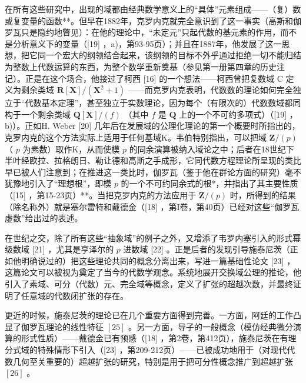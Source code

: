 在所有这些研究中，出现的域都由经典数学意义上的“具体”元素组成——（复）数或复变量的函数**。但早在1882年，克罗内克就完全意识到了这一事实（高斯和伽罗瓦只是隐约地瞥见）：在他的理论中，“未定元”只起代数的基元素的作用，而不是分析意义下的变量（{[}19{]} ，a)，第93-95页）；并且在1887年，他发展了这一思想，把它同一个宏大的纲领结合起来，该纲领的目标不外乎通过拒绝一切不能归结为整数上代数运算的东西，为整个数学重新奠基（参见第一册第四章的历史注记）。正是在这个场合，他接过了柯西 {[}16{]} 的一个想法——柯西曾把复数域 C 定义为剩余类域 \(\mathbf{R}[\mathbf{X}] / (\mathbf{X}^2 + 1)\) ——而克罗内克表明，代数数的理论如何完全独立于“代数基本定理”，甚至独立于实数理论，因为每个（有限次的）代数数域都同构于一个剩余类域 \(\mathbf{Q}[\mathbf{X}] / (f)\) （其中 \(f\) 是 \(\mathbf{Q}\) 上的一个不可约多项式）（{[}19{]} ，b)）。正如H. Weber {[}20{]} 几年后在发展域的公理化理论的第一个概要时所指出的，克罗内克的这个方法实际上适用于任何基域K。韦伯特别指出，可以把域 \(\mathbf{Z}/(p)\) （ \(p\) 为素数）取作K，从而使模 \(p\) 的同余演算被纳入域论之中；后者在18世纪下半叶经欧拉、拉格朗日、勒让德和高斯之手成形，它同代数方程理论所呈现的类比早已被人们注意到；在推进这一类比时，伽罗瓦（鉴于他在群论方面的研究）毫不犹豫地引入了“理想根”，即模 \(p\) 的一个不可约同余式的根*，并指出了其主要性质（{[}15{]} ，第15-23页）**。当把克罗内克的方法应用于 \(\mathbf{Z}/(p)\) 时，所得到的结果（除名称外）就是塞尔雷特和戴德金（{[}18{]} ，第I卷，第40页）已经对这些“伽罗瓦虚数”给出过的表述。

在世纪之交，除了所有这些“抽象域”的例子之外，又增添了韦罗内塞引入的形式幂级数域 {[}21{]} ，尤其是亨泽尔的 \(p\) 进数域 {[}22{]} 。正是后者的发现引导施泰尼茨（正如他明确说过的）把这些理论共同的概念分离出来，写进一篇基础性论文 {[}23{]} ，这篇论文可以被视为奠定了当今的代数学观念。系统地展开交换域公理的推论，他引入了素域、可分（代数）元、完全域等概念，定义了扩张的超越次数，并最终证明了任意域的代数闭扩张的存在。

更近的时候，施泰尼茨的理论已在几个重要方面得到完善。一方面，阿廷的工作凸显了伽罗瓦理论的线性特征 \([25]\) 。另一方面，导子的一般概念（模仿经典微分演算的形式性质）——戴德金已有预感（{[}18{]} ，第2卷，第412页），施泰尼茨在有理分式域的特殊情形下引入（{[}23{]} ，第209-212页）——已被成功地用于（对现代代数几何至关重要的）超越扩张的研究，特别是用于把可分性概念推广到超越扩张 \([26]\) 。

